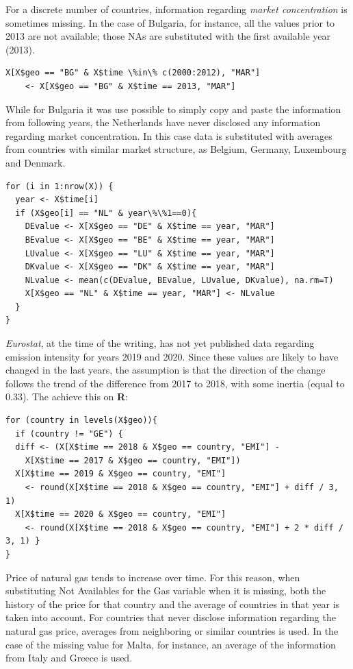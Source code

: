 \documentclass{book}
\begin{document}
\begin{appendices}
\noindent For a discrete number of countries, information regarding \textit{market concentration} is sometimes missing. In the case of Bulgaria, for instance, all the values prior to 2013 are not available; those NAs are substituted with the first available year (2013).

\begin{verbatim}
X[X$geo == "BG" & X$time \%in\% c(2000:2012), "MAR"] 
	<- X[X$geo == "BG" & X$time == 2013, "MAR"]
\end{verbatim}

While for Bulgaria it was use possible to simply copy and paste the information from following years, the Netherlands have never disclosed any information regarding market concentration. In this case data is substituted with averages from countries with similar market structure, as Belgium, Germany, Luxembourg and Denmark.

\begin{verbatim}
for (i in 1:nrow(X)) {
  year <- X$time[i]
  if (X$geo[i] == "NL" & year\%\%1==0){
    DEvalue <- X[X$geo == "DE" & X$time == year, "MAR"]
    BEvalue <- X[X$geo == "BE" & X$time == year, "MAR"]
    LUvalue <- X[X$geo == "LU" & X$time == year, "MAR"]
    DKvalue <- X[X$geo == "DK" & X$time == year, "MAR"]
    NLvalue <- mean(c(DEvalue, BEvalue, LUvalue, DKvalue), na.rm=T)
    X[X$geo == "NL" & X$time == year, "MAR"] <- NLvalue
  }
}
\end{verbatim}

\noindent \textit{Eurostat}, at the time of the writing, has not yet published data regarding emission intensity for years 2019 and 2020. Since these values are likely to have changed in the last years, the assumption is that the direction of the change follows the trend of the difference from 2017 to 2018, with some inertia (equal to 0.33). The achieve this on \textbf{R}:

\begin{verbatim}
for (country in levels(X$geo)){
  if (country != "GE") {
  diff <- (X[X$time == 2018 & X$geo == country, "EMI"] -
	X[X$time == 2017 & X$geo == country, "EMI"])
  X[X$time == 2019 & X$geo == country, "EMI"] 
	<- round(X[X$time == 2018 & X$geo == country, "EMI"] + diff / 3, 1)
  X[X$time == 2020 & X$geo == country, "EMI"]
	<- round(X[X$time == 2018 & X$geo == country, "EMI"] + 2 * diff / 3, 1) }
}
\end{verbatim}

\noindent Price of natural gas tends to increase over time. For this reason, when substituting Not Availables for the Gas variable when it is missing, both the history of the price for that country and the average of countries in that year is taken into account. For countries that never disclose information regarding the natural gas price, averages from neighboring or similar countries is used. In the case of the missing value for Malta, for instance, an average of the information from Italy and Greece is used.


\end{appendices}
\end{document}
